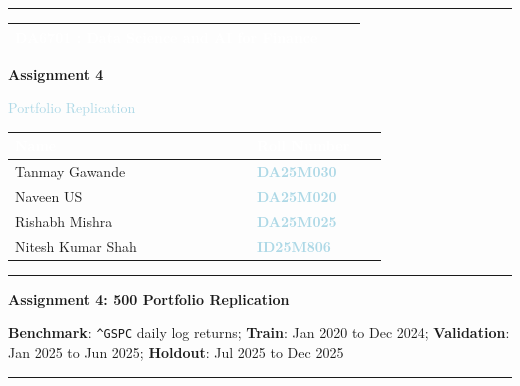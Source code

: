 \documentclass[10pt,a4paper]{article}
\renewcommand{\arraystretch}{1.16}
\newcommand{\CoverCourse}{DA6701 : Data Science and AI for Finance}
\newcommand{\CoverAssignment}{Assignment 4}
\newcommand{\CoverTopic}{Portfolio Replication}
\newcommand{\MemberOneName}{Tanmay Gawande}
\newcommand{\MemberOneRoll}{DA25M030}
\newcommand{\MemberTwoName}{Naveen US}
\newcommand{\MemberTwoRoll}{DA25M020}
\newcommand{\MemberThreeName}{Rishabh Mishra}
\newcommand{\MemberThreeRoll}{DA25M025}
\newcommand{\MemberFourName}{Nitesh Kumar Shah}
\newcommand{\MemberFourRoll}{ID25M806}
\newcommand{\ReportTitle}{Assignment 4: 500 Portfolio Replication}
\newcommand{\ReportSubtitle}{\textbf{Benchmark}: \texttt{\string^GSPC} daily log returns; \textbf{Train}: Jan 2020 to Dec 2024; \textbf{Validation}: Jan 2025 to Jun 2025; \textbf{Holdout}: Jul 2025 to Dec 2025}
\begin{document}
\color{BodyGray}
\thispagestyle{empty}
\begin{center}
  \vspace*{0.3cm}
  \textcolor{ReportBlue}{\rule{0.98\linewidth}{1.2pt}}

  \vspace{1.05cm}
  \begin{tabular}{|>{\centering\arraybackslash}p{0.90\linewidth}|}
    \hline
    \rowcolor{LightBlue}
    \textcolor{white}{\fontsize{12}{14}\selectfont\textbf{\CoverCourse}} \\
    \hline
  \end{tabular}

  \vspace{1.55cm}
  {\fontsize{30}{34}\selectfont\textbf{\textcolor{ReportBlue}{\CoverAssignment}}}\par
  \vspace{3pt}
  {\fontsize{20}{24}\selectfont\textcolor{LightBlue}{\CoverTopic}}\par

  \vspace{1.7cm}
  {\renewcommand{\arraystretch}{1.30}
  \begin{tabular}{|>{\centering\arraybackslash}p{0.48\linewidth}|>{\centering\arraybackslash}p{0.26\linewidth}|}
    \hline
    \rowcolor{ReportBlue}
    \textcolor{white}{\textbf{Name}} & \textcolor{white}{\textbf{Roll Number}} \\
    \hline
    \MemberOneName & \textcolor{LightBlue}{\textbf{\MemberOneRoll}} \\
    \MemberTwoName & \textcolor{LightBlue}{\textbf{\MemberTwoRoll}} \\
    \MemberThreeName & \textcolor{LightBlue}{\textbf{\MemberThreeRoll}} \\
    \MemberFourName & \textcolor{LightBlue}{\textbf{\MemberFourRoll}} \\
    \hline
  \end{tabular}}

  \vfill
  \textcolor{MidGray}{\rule{0.96\linewidth}{0.8pt}}
\end{center}
\newpage

\begin{center}
  {\fontsize{15}{17}\selectfont\textbf{\textcolor{ReportBlue}{\ReportTitle}}}\par
  \vspace{1pt}
  {\fontsize{8}{10}\selectfont\textcolor{CaptionGray}{\ReportSubtitle}}
\end{center}
\vspace{3pt}
\noindent\textcolor{ReportBlue}{\rule{\linewidth}{2pt}}
\vspace{5pt}
\end{document}
